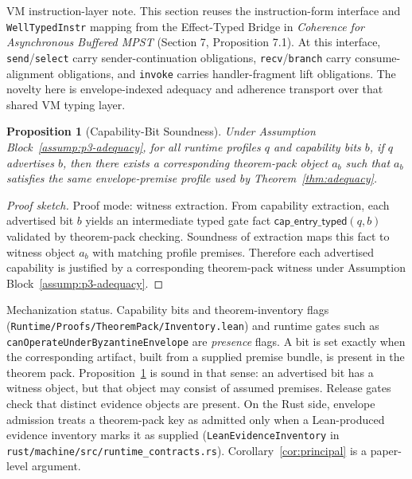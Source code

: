\documentclass[a4paper,10pt,twocolumn,english]{article}
\numberwithin{equation}{section}
\theoremstyle{paperdef}
\theoremstyle{paperplain}
\newtheorem{proposition}[definition]{Proposition}
\theoremstyle{paperdef}
\theoremstyle{paperremark}
\theoremstyle{paperdef}
\begin{document}
VM instruction-layer note. This section reuses the instruction-form interface and \texttt{WellTypedInstr} mapping from the Effect-Typed Bridge in \emph{Coherence for Asynchronous Buffered MPST} (Section 7, Proposition 7.1). At this interface, \texttt{send}/\texttt{select} carry sender-continuation obligations, \texttt{recv}/\texttt{branch} carry consume-alignment obligations, and \texttt{invoke} carries handler-fragment lift obligations. The novelty here is envelope-indexed adequacy and adherence transport over that shared VM typing layer.

\begin{proposition}[Capability-Bit Soundness]
	\label{prop:capability}
	Under Assumption Block~\ref{assump:p3-adequacy}, for all runtime profiles $q$ and capability bits $b$, if $q$ advertises $b$, then there exists a corresponding theorem-pack object $a_b$ such that $a_b$ satisfies the same envelope-premise profile used by Theorem~\ref{thm:adequacy}.
\end{proposition}

\begin{proof}[Proof sketch]
	Proof mode: witness extraction.
	From capability extraction, each advertised bit $b$ yields an intermediate
	typed gate fact
	$\mathsf{cap\_entry\_typed}(q,b)$ validated by theorem-pack checking.
	Soundness of extraction maps this fact to witness object $a_b$ with matching
	profile premises. Therefore each advertised capability is justified by a
	corresponding theorem-pack witness under Assumption
	Block~\ref{assump:p3-adequacy}.
\end{proof}

Mechanization status. Capability bits and theorem-inventory flags
(\texttt{Runtime/\allowbreak Proofs/\allowbreak TheoremPack/\allowbreak Inventory.lean}) and runtime gates
such as \nolinkurl{canOperateUnderByzantineEnvelope} are \emph{presence} flags.
A bit is set exactly when the corresponding artifact, built from a supplied premise
bundle, is present in the theorem pack. Proposition~\ref{prop:capability} is
sound in that sense: an advertised bit has a witness object, but that object may
consist of assumed premises. Release gates check that distinct evidence objects
are present. On the Rust side, envelope admission treats a theorem-pack key as
admitted only when a Lean-produced evidence inventory marks it as supplied
(\texttt{LeanEvidenceInventory} in
\texttt{rust/\allowbreak machine/\allowbreak src/\allowbreak runtime\_contracts.rs}). Corollary~\ref{cor:principal}
is a paper-level argument.
\end{document}
